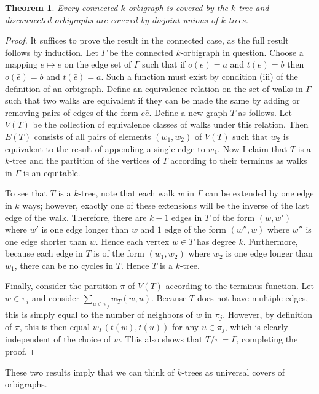 \documentclass[12pt]{article}
\theoremstyle{plain}
\newtheorem{theorem}{Theorem}
\theoremstyle{definition}
\theoremstyle{remark}
\providecommand{\rev}[1]{\bar{#1}}
\begin{document}
    \begin{theorem}\label{thm:UniversalCovers}
      Every connected $k$-orbigraph is covered by the $k$-tree and disconnected orbigraphs are covered by disjoint unions of $k$-trees.
    \end{theorem}
    \begin{proof}
      It suffices to prove the result in the connected case, as the full result follows by induction. Let $\Gamma$ be the connected $k$-orbigraph in question. Choose a mapping $e \mapsto \rev{e}$ on the edge set of $\Gamma$ such that if $o(e) = a$ and $t(e) = b$ then $o(\rev{e}) = b$ and $t(\rev{e}) = a$. Such a function must exist by condition (iii) of the definition of an orbigraph. Define an equivalence relation on the set of walks in $\Gamma$ such that two walks are equivalent if they can be made the same by adding or removing pairs of edges of the form $e\rev{e}$. Define a new graph $T$ as follows. Let $V(T)$ be the collection of equivalence classes of walks under this relation. Then $E(T)$ consists of all pairs of elements $(w_1, w_2)$ of $V(T)$ such that $w_2$ is equivalent to the result of appending a single edge to $w_1$. Now I claim that $T$ is a $k$-tree and the partition of the vertices of $T$ according to their terminus as walks in $\Gamma$ is an equitable.

      To see that $T$ is a $k$-tree, note that each walk $w$ in $\Gamma$ can be extended by one edge in $k$ ways; however, exactly one of these extensions will be the inverse of the last edge of the walk. Therefore, there are $k-1$ edges in $T$ of the form $(w, w')$ where $w'$ is one edge longer than $w$ and $1$ edge of the form $(w'', w)$ where $w''$ is one edge shorter than $w$. Hence each vertex $w \in T$ has degree $k$. Furthermore, because each edge in $T$ is of the form $(w_1, w_2)$ where $w_2$ is one edge longer than $w_1$, there can be no cycles in $T$. Hence $T$ is a $k$-tree.

      Finally, consider the partition $\pi$ of $V(T)$ according to the terminus function. Let $w \in \pi_i$ and consider $\sum_{u \in \pi_j} w_T(w, u)$. Because $T$ does not have multiple edges, this is simply equal to the number of neighbors of $w$ in $\pi_j$. However, by definition of $\pi$, this is then equal $w_\Gamma(t(w), t(u))$ for any $u \in \pi_j$, which is clearly independent of the choice of $w$. This also shows that $T / \pi = \Gamma$, completing the proof.
      \end{proof}

    These two results imply that we can think of $k$-trees as universal covers of orbigraphs.
\end{document}
